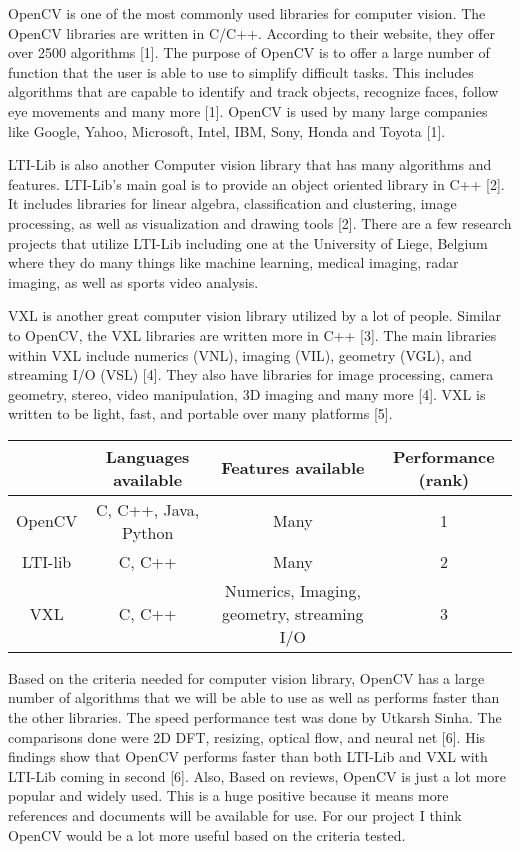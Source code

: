 \documentclass[letterpaper,10pt,onecolumn,draftclsnofoot]{IEEEtran}
\begin{document}
OpenCV is one of the most commonly used libraries for computer vision.
The OpenCV libraries are written in C/C++.
According to their website, they offer over 2500 algorithms [1].
The purpose of OpenCV is to offer a large number of function that the user is able to use to simplify difficult tasks.
This includes algorithms that are capable to identify and track objects, recognize faces, follow eye movements and many more [1].
OpenCV is used by many large companies like Google, Yahoo, Microsoft, Intel, IBM, Sony, Honda and Toyota [1]. 

LTI-Lib is also another Computer vision library that has many algorithms and features.
LTI-Lib's main goal is to provide an object oriented library in C++ [2].
It includes libraries for linear algebra, classification and clustering, image processing, as well as visualization and drawing tools [2].
There are a few research projects that utilize LTI-Lib including one at the University of Liege, Belgium where they do many things like machine learning, medical imaging, radar imaging, as well as sports video analysis.


VXL is another great computer vision library utilized by a lot of people.
Similar to OpenCV, the VXL libraries are written more in C++ [3].
The main libraries within VXL include numerics (VNL), imaging (VIL), geometry (VGL), and streaming I/O (VSL) [4].
They also have libraries for image processing, camera geometry, stereo, video manipulation, 3D imaging and many more [4].
VXL is written to be light, fast, and portable over many platforms [5].


\begin{center}
	\begin{tabular}{|c|c|c|c|}
		
		\hline
		\textbf{} & \textbf{Languages available} & \textbf{Features available} & \textbf{Performance (rank)} \\
		\hline
		OpenCV & C, C++, Java, Python & Many & 1 \\
		\hline
		LTI-lib & C, C++ & Many & 2 \\
		\hline
		VXL & C, C++ & Numerics, Imaging, geometry, streaming I/O & 3 \\
		\hline
		
	\end{tabular}
\end{center}

Based on the criteria needed for computer vision library, OpenCV has a large number of algorithms that we will be able to use as well as performs faster than the other libraries.
The speed performance test was done by Utkarsh Sinha.
The comparisons done were 2D DFT, resizing, optical flow, and neural net [6].
His findings show that OpenCV performs faster than both LTI-Lib and VXL with LTI-Lib coming in second [6].
Also, Based on reviews, OpenCV is just a lot more popular and widely used.
This is a huge positive because it means more references and documents will be available for use.
For our project I think OpenCV would be a lot more useful based on the criteria tested.
\end{document}

